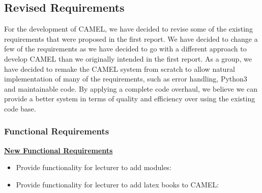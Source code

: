 \subsection{Revised Requirements}
	For the development of CAMEL, we have decided to revise some of the existing requirements that were proposed in the first report. We have decided to change a few of the requirements as we have decided to go with a different approach to develop CAMEL than we originally intended in the first report. As a group, we have decided to remake the CAMEL system from scratch to allow natural implementation of many of the requirements, such as error handling, Python3 and maintainable code. By applying a complete code overhaul, we believe we can provide a better system in terms of quality and efficiency over using the existing code base.\\    
	
	\subsubsection{Functional Requirements}
	\underline{\textbf{New Functional Requirements}}
	\begin{itemize}
		\item Provide functionality for lecturer to add modules:
		\item Provide functionality for lecturer to add latex books to CAMEL:
	\end{itemize}
	
